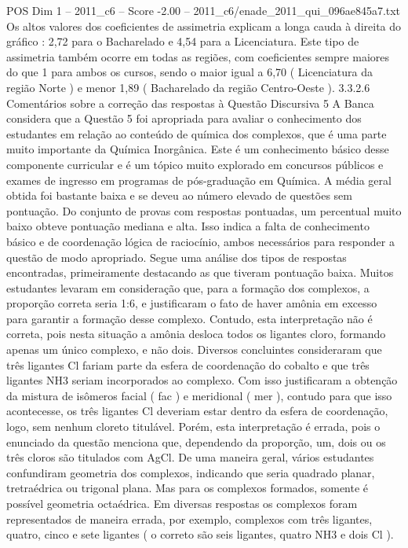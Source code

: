 \begin{textsample}{POS Dim 1 – 2011\_c6 – Score -2.00 – 2011\_c6/enade\_2011\_qui\_096ae845a7.txt}
Os altos valores dos coeficientes de assimetria explicam a longa cauda à direita do gráfico : 2,72 para o Bacharelado e 4,54 para a Licenciatura.
Este tipo de assimetria também ocorre em todas as regiões, com coeficientes sempre maiores do que 1 para ambos os cursos, sendo o maior igual a 6,70 ( Licenciatura da região Norte ) e menor 1,89 ( Bacharelado da região Centro-Oeste ). 3.3.2.6 Comentários sobre a correção das respostas à Questão Discursiva 5 A Banca considera que a Questão 5 foi apropriada para avaliar o conhecimento dos estudantes em relação ao conteúdo de química dos complexos, que é uma parte muito importante da Química Inorgânica.
Este é um conhecimento básico desse componente curricular e é um tópico muito explorado em concursos públicos e exames de ingresso em programas de pós-graduação em Química.
A média geral obtida foi bastante baixa e se deveu ao número elevado de questões sem pontuação.
Do conjunto de provas com respostas pontuadas, um percentual muito baixo obteve pontuação mediana e alta.
Isso indica a falta de conhecimento básico e de coordenação lógica de raciocínio, ambos necessários para responder a questão de modo apropriado.
Segue uma análise dos tipos de respostas encontradas, primeiramente destacando as que tiveram pontuação baixa.
Muitos estudantes levaram em consideração que, para a formação dos complexos, a proporção correta seria 1:6, e justificaram o fato de haver amônia em excesso para garantir a formação desse complexo.
Contudo, esta interpretação não é correta, pois nesta situação a amônia desloca todos os ligantes cloro, formando apenas um único complexo, e não dois.
Diversos concluintes consideraram que três ligantes Cl fariam parte da esfera de coordenação do cobalto e que três ligantes NH3 seriam incorporados ao complexo.
Com isso justificaram a obtenção da mistura de isômeros facial ( fac ) e meridional ( mer ), contudo para que isso acontecesse, os três ligantes Cl deveriam estar dentro da esfera de coordenação, logo, sem nenhum cloreto titulável.
Porém, esta interpretação é errada, pois o enunciado da questão menciona que, dependendo da proporção, um, dois ou os três cloros são titulados com AgCl.
De uma maneira geral, vários estudantes confundiram geometria dos complexos, indicando que seria quadrado planar, tretraédrica ou trigonal plana.
Mas para os complexos formados, somente é possível geometria octaédrica.
Em diversas respostas os complexos foram representados de maneira errada, por exemplo, complexos com três ligantes, quatro, cinco e sete ligantes ( o correto são seis ligantes, quatro NH3 e dois Cl ).

\end{textsample}
